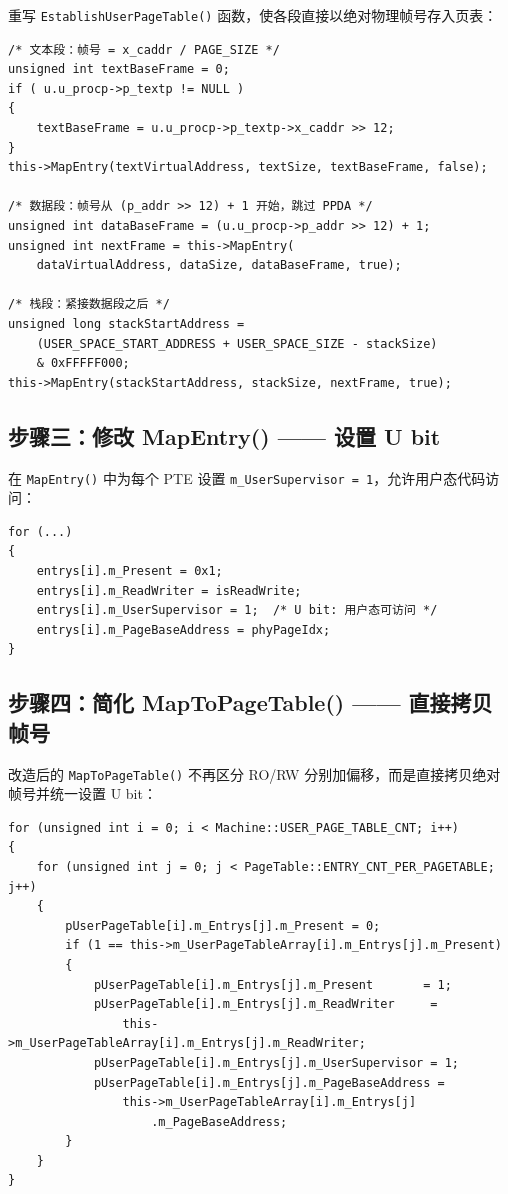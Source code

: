 \documentclass[12pt]{article}
\begin{document}
重写 \texttt{EstablishUserPageTable()} 函数，使各段直接以绝对物理帧号存入页表：

\begin{lstlisting}[caption={EstablishUserPageTable 核心逻辑}]
/* 文本段：帧号 = x_caddr / PAGE_SIZE */
unsigned int textBaseFrame = 0;
if ( u.u_procp->p_textp != NULL )
{
    textBaseFrame = u.u_procp->p_textp->x_caddr >> 12;
}
this->MapEntry(textVirtualAddress, textSize, textBaseFrame, false);

/* 数据段：帧号从 (p_addr >> 12) + 1 开始，跳过 PPDA */
unsigned int dataBaseFrame = (u.u_procp->p_addr >> 12) + 1;
unsigned int nextFrame = this->MapEntry(
    dataVirtualAddress, dataSize, dataBaseFrame, true);

/* 栈段：紧接数据段之后 */
unsigned long stackStartAddress =
    (USER_SPACE_START_ADDRESS + USER_SPACE_SIZE - stackSize)
    & 0xFFFFF000;
this->MapEntry(stackStartAddress, stackSize, nextFrame, true);
\end{lstlisting}

\subsection{步骤三：修改 MapEntry() —— 设置 U bit}

在 \texttt{MapEntry()} 中为每个 PTE 设置 \texttt{m\_UserSupervisor = 1}，允许用户态代码访问：

\begin{lstlisting}[caption={MapEntry 设置 U bit}]
for (...)
{
    entrys[i].m_Present = 0x1;
    entrys[i].m_ReadWriter = isReadWrite;
    entrys[i].m_UserSupervisor = 1;  /* U bit: 用户态可访问 */
    entrys[i].m_PageBaseAddress = phyPageIdx;
}
\end{lstlisting}

\subsection{步骤四：简化 MapToPageTable() —— 直接拷贝帧号}

改造后的 \texttt{MapToPageTable()} 不再区分 RO/RW 分别加偏移，而是直接拷贝绝对帧号并统一设置 U bit：

\begin{lstlisting}[caption={MapToPageTable 简化逻辑}]
for (unsigned int i = 0; i < Machine::USER_PAGE_TABLE_CNT; i++)
{
    for (unsigned int j = 0; j < PageTable::ENTRY_CNT_PER_PAGETABLE; j++)
    {
        pUserPageTable[i].m_Entrys[j].m_Present = 0;
        if (1 == this->m_UserPageTableArray[i].m_Entrys[j].m_Present)
        {
            pUserPageTable[i].m_Entrys[j].m_Present       = 1;
            pUserPageTable[i].m_Entrys[j].m_ReadWriter     =
                this->m_UserPageTableArray[i].m_Entrys[j].m_ReadWriter;
            pUserPageTable[i].m_Entrys[j].m_UserSupervisor = 1;
            pUserPageTable[i].m_Entrys[j].m_PageBaseAddress =
                this->m_UserPageTableArray[i].m_Entrys[j]
                    .m_PageBaseAddress;
        }
    }
}
\end{lstlisting}
\end{document}
